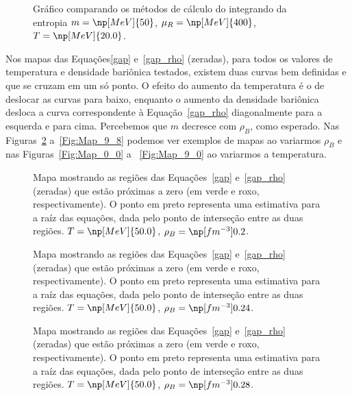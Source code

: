 \begin{figure}
	
	\caption{Gráfico comparando os métodos de cálculo do integrando da entropia $m = \np[MeV]{50}$, $\mu_R = \np[MeV]{400}$, $T = \np[MeV]{20.0}$. \protect}
	\label{Fig:Test_entropy_integrand_calc_0_4_4}
\end{figure}

\FloatBarrier



Nos mapas das Equações\eqref{gap} e~\eqref{gap_rho} (zeradas), para todos os valores de temperatura e densidade bariônica testados, existem duas curvas bem definidas e que se cruzam em um só ponto. O efeito do aumento da temperatura é o de deslocar as curvas para baixo, enquanto o aumento da densidade bariônica desloca a curva correspondente à Equação~\eqref{gap_rho} diagonalmente para a esquerda e para cima. Percebemos que $m$ decresce com $\rho_B$, como esperado. Nas Figuras~\ref{Fig:Map_9_4} a~\ref{Fig:Map_9_8} podemos ver exemplos de mapas ao variarmos $\rho_B$ e nas Figuras~\ref{Fig:Map_0_0} a ~\ref{Fig:Map_9_0} ao variarmos a temperatura.


\begin{figure}
	
	\caption{Mapa mostrando as regiões das Equações~\ref{gap} e~\ref{gap_rho} (zeradas) que estão próximas a zero (em verde e roxo, respectivamente). O ponto em preto representa uma estimativa para a raíz das equações, dada pelo ponto de interseção entre as duas regiões.  $T = \np[MeV]{50.0}$, $\rho_B = \np[fm^{-3}]{0.2}$.\protect}
	\label{Fig:Map_9_4}
\end{figure}

\begin{figure}
	
	\caption{Mapa mostrando as regiões das Equações~\ref{gap} e~\ref{gap_rho} (zeradas) que estão próximas a zero (em verde e roxo, respectivamente). O ponto em preto representa uma estimativa para a raíz das equações, dada pelo ponto de interseção entre as duas regiões. $T = \np[MeV]{50.0}$, $\rho_B = \np[fm^{-3}]{0.24}$.\protect}
	\label{Fig:Map_9_5}
\end{figure}

\begin{figure}
	
	\caption{Mapa mostrando as regiões das Equações~\ref{gap} e~\ref{gap_rho} (zeradas) que estão próximas a zero (em verde e roxo, respectivamente). O ponto em preto representa uma estimativa para a raíz das equações, dada pelo ponto de interseção entre as duas regiões. $T = \np[MeV]{50.0}$, $\rho_B = \np[fm^{-3}]{0.28}$.\protect}
	\label{Fig:Map_9_6}
\end{figure}


